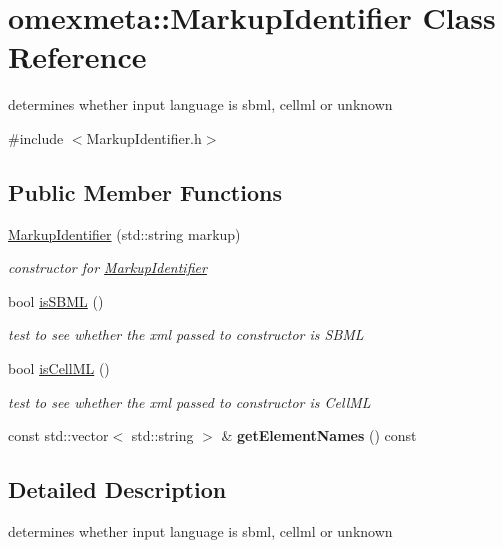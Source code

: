 \hypertarget{classomexmeta_1_1MarkupIdentifier}{}\section{omexmeta\+:\+:Markup\+Identifier Class Reference}
\label{classomexmeta_1_1MarkupIdentifier}


determines whether input language is sbml, cellml or unknown  




{\ttfamily \#include $<$Markup\+Identifier.\+h$>$}

\subsection*{Public Member Functions}
\begin{DoxyCompactItemize}
\item 
\hyperlink{classomexmeta_1_1MarkupIdentifier_a0bb73ce6d5c94efcd97471059a378058}{Markup\+Identifier} (std\+::string markup)
\begin{DoxyCompactList}\small\item\em constructor for \hyperlink{classomexmeta_1_1MarkupIdentifier}{Markup\+Identifier} \end{DoxyCompactList}\item 
bool \hyperlink{classomexmeta_1_1MarkupIdentifier_a541ffd197ce109e20112923d7fc0641b}{is\+S\+B\+ML} ()
\begin{DoxyCompactList}\small\item\em test to see whether the xml passed to constructor is S\+B\+ML \end{DoxyCompactList}\item 
bool \hyperlink{classomexmeta_1_1MarkupIdentifier_a2fd631a49a8a3d06e668cdbf130d5cb3}{is\+Cell\+ML} ()
\begin{DoxyCompactList}\small\item\em test to see whether the xml passed to constructor is Cell\+ML \end{DoxyCompactList}\item 
\mbox{\label{classomexmeta_1_1MarkupIdentifier_ab1736abf0d275bcb6eefcb7f08dcbd4f}} 
const std\+::vector$<$ std\+::string $>$ \& {\bfseries get\+Element\+Names} () const
\end{DoxyCompactItemize}


\subsection{Detailed Description}
determines whether input language is sbml, cellml or unknown 

